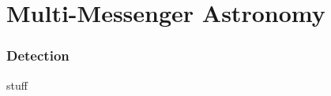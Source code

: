 \documentclass{beamer}
\begin{document}
\section{Multi-Messenger Astronomy}
\begin{frame}
\frametitle{Detection}
stuff

\smallskip
\end{frame}




\begin{frame}
\printbibliography
\end{frame}





\end{document}
